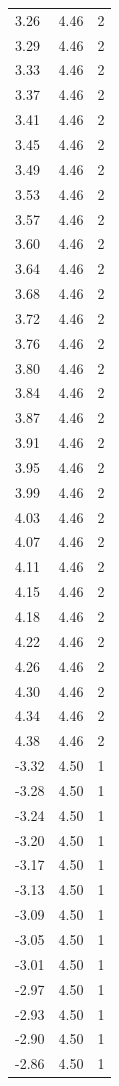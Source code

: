 \begin{longtable}{lrr}
  3.26 & 4.46 & 2 \\
  3.29 & 4.46 & 2 \\
  3.33 & 4.46 & 2 \\
  3.37 & 4.46 & 2 \\
  3.41 & 4.46 & 2 \\
  3.45 & 4.46 & 2 \\
  3.49 & 4.46 & 2 \\
  3.53 & 4.46 & 2 \\
  3.57 & 4.46 & 2 \\
  3.60 & 4.46 & 2 \\
  3.64 & 4.46 & 2 \\
  3.68 & 4.46 & 2 \\
  3.72 & 4.46 & 2 \\
  3.76 & 4.46 & 2 \\
  3.80 & 4.46 & 2 \\
  3.84 & 4.46 & 2 \\
  3.87 & 4.46 & 2 \\
  3.91 & 4.46 & 2 \\
  3.95 & 4.46 & 2 \\
  3.99 & 4.46 & 2 \\
  4.03 & 4.46 & 2 \\
  4.07 & 4.46 & 2 \\
  4.11 & 4.46 & 2 \\
  4.15 & 4.46 & 2 \\
  4.18 & 4.46 & 2 \\
  4.22 & 4.46 & 2 \\
  4.26 & 4.46 & 2 \\
  4.30 & 4.46 & 2 \\
  4.34 & 4.46 & 2 \\
  4.38 & 4.46 & 2 \\
  -3.32 & 4.50 & 1 \\
  -3.28 & 4.50 & 1 \\
  -3.24 & 4.50 & 1 \\
  -3.20 & 4.50 & 1 \\
  -3.17 & 4.50 & 1 \\
  -3.13 & 4.50 & 1 \\
  -3.09 & 4.50 & 1 \\
  -3.05 & 4.50 & 1 \\
  -3.01 & 4.50 & 1 \\
  -2.97 & 4.50 & 1 \\
  -2.93 & 4.50 & 1 \\
  -2.90 & 4.50 & 1 \\
  -2.86 & 4.50 & 1 \\

\end{longtable}
